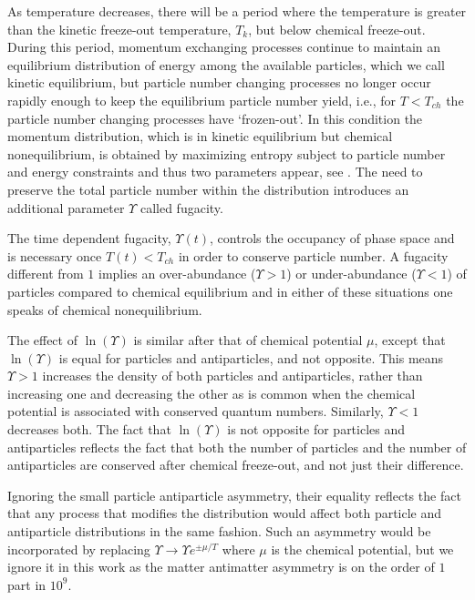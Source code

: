 As temperature decreases, there will be a period where the temperature is greater than the kinetic freeze-out temperature, $T_k$, but below chemical freeze-out. During this period, momentum exchanging processes continue to maintain an equilibrium distribution of energy among the available particles, which we call kinetic equilibrium, but particle number changing processes no longer occur rapidly enough to keep the equilibrium particle number yield, i.e., for $T<T_{ch}$ the particle number changing processes have `frozen-out'. In this condition the momentum distribution, which is in kinetic equilibrium but chemical nonequilibrium, is obtained by maximizing entropy subject to particle number and energy constraints and thus two parameters appear, see . The need to preserve the total particle number within the distribution introduces an additional parameter $\Upsilon$ called fugacity. 

The time dependent fugacity, $\Upsilon(t)$, controls the occupancy of phase space and is necessary once $T(t)<T_{ch}$ in order to conserve particle number. A fugacity different from $1$ implies an over-abundance ($\Upsilon>1$) or under-abundance ($\Upsilon<1$) of particles compared to chemical equilibrium and in either of these situations one speaks of chemical nonequilibrium. 

The effect of $\ln(\Upsilon)$ is similar after that of chemical potential $\mu$, except that $\ln(\Upsilon)$ is equal for particles and antiparticles, and not opposite. This means $\Upsilon>1$ increases the density of both particles and antiparticles, rather than increasing one and decreasing the other as is common when the chemical potential is associated with conserved quantum numbers. Similarly,  $\Upsilon<1$ decreases both. The fact that $\ln(\Upsilon)$ is not opposite for particles and antiparticles reflects the fact that both the number of particles and the number of antiparticles are conserved after chemical freeze-out, and not just their difference. 

Ignoring the small particle antiparticle asymmetry, their equality reflects the fact that any process that modifies the distribution would affect both particle and antiparticle distributions in the same fashion. Such an asymmetry would be incorporated by replacing $\Upsilon\rightarrow \Upsilon e^{\pm\mu/T}$ where $\mu$ is the chemical potential, but we ignore it in this work as the matter antimatter asymmetry is on the order of $1$ part in $10^9$.

